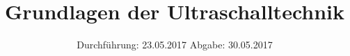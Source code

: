 


\subject{US1}
\title{Grundlagen der Ultraschalltechnik}
\date{
	Durchführung: 23.05.2017
	\hspace{4em}
	Abgabe: 30.05.2017
}


	\maketitle
	\newpage
	\tableofcontents
	\newpage
	
	
	
	
	
	
	\newpage
	
	\printbibliography

